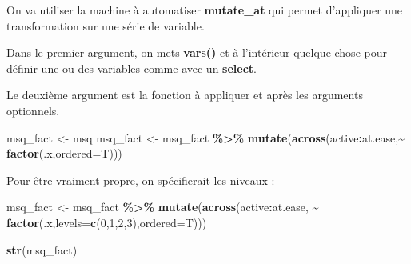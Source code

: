 \documentclass[
]{book}
\newenvironment{Shaded}{\begin{snugshade}}{\end{snugshade}}
\newcommand{\AttributeTok}[1]{\textcolor[rgb]{0.13,0.29,0.53}{#1}}
\newcommand{\DecValTok}[1]{\textcolor[rgb]{0.00,0.00,0.81}{#1}}
\newcommand{\FunctionTok}[1]{\textcolor[rgb]{0.13,0.29,0.53}{\textbf{#1}}}
\newcommand{\NormalTok}[1]{#1}
\newcommand{\OtherTok}[1]{\textcolor[rgb]{0.56,0.35,0.01}{#1}}
\newcommand{\SpecialCharTok}[1]{\textcolor[rgb]{0.81,0.36,0.00}{\textbf{#1}}}
\begin{document}
On va utiliser la machine à automatiser \textbf{mutate\_at} qui permet d'appliquer une
transformation sur une série de variable.

Dans le premier argument, on mets \textbf{vars()} et à l'intérieur quelque chose pour
définir une ou des variables comme avec un \textbf{select}.

Le deuxième argument est la fonction à appliquer et après les arguments optionnels.

\begin{Shaded}
\begin{Highlighting}[]
\NormalTok{msq\_fact }\OtherTok{\textless{}{-}}\NormalTok{ msq}
\NormalTok{msq\_fact }\OtherTok{\textless{}{-}}\NormalTok{ msq\_fact }\SpecialCharTok{\%\textgreater{}\%} \FunctionTok{mutate}\NormalTok{(}\FunctionTok{across}\NormalTok{(active}\SpecialCharTok{:}\NormalTok{at.ease,}\SpecialCharTok{\textasciitilde{}} \FunctionTok{factor}\NormalTok{(.x,}\AttributeTok{ordered=}\NormalTok{T)))}
\end{Highlighting}
\end{Shaded}

Pour être vraiment propre, on spécifierait les niveaux :

\begin{Shaded}
\begin{Highlighting}[]
\NormalTok{msq\_fact }\OtherTok{\textless{}{-}}\NormalTok{ msq\_fact }\SpecialCharTok{\%\textgreater{}\%} \FunctionTok{mutate}\NormalTok{(}\FunctionTok{across}\NormalTok{(active}\SpecialCharTok{:}\NormalTok{at.ease, }\SpecialCharTok{\textasciitilde{}} \FunctionTok{factor}\NormalTok{(.x,}\AttributeTok{levels=}\FunctionTok{c}\NormalTok{(}\DecValTok{0}\NormalTok{,}\DecValTok{1}\NormalTok{,}\DecValTok{2}\NormalTok{,}\DecValTok{3}\NormalTok{),}\AttributeTok{ordered=}\NormalTok{T)))}
\end{Highlighting}
\end{Shaded}

\begin{Shaded}
\begin{Highlighting}[]
\FunctionTok{str}\NormalTok{(msq\_fact)}
\end{Highlighting}
\end{Shaded}
\end{document}
